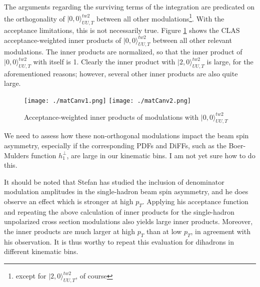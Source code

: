 \documentclass[12pt]{article}
\begin{document}
The arguments regarding the surviving terms of the integration are predicated on
the orthogonality of $|0,0\rangle_{UU,T}^{tw2}$ between all other
modulations\footnote{except for $|2,0\rangle_{UU,T}^{tw2}$, of course}. With the
acceptance limitations, this is not necessarily true. Figure \ref{innerproducts}
shows the CLAS acceptance-weighted inner products of $|0,0\rangle_{UU,T}^{tw2}$
between all other relevant modulations. The inner products are normalized, so
that the inner product of $|0,0\rangle_{UU,T}^{tw2}$ with itself is 1. Clearly
the inner product with $|2,0\rangle_{UU,T}^{tw2}$ is large, for the
aforementioned reasons; however, several other inner products are also quite
large.


\begin{figure}[h!]
\centering
\texttt{[image: ./matCanv1.png]}
\texttt{[image: ./matCanv2.png]}
\caption{Acceptance-weighted inner products of modulations with $|0,0\rangle_{UU,T}^{tw2}$}
\label{innerproducts}
\end{figure}

We need to assess how these non-orthogonal modulations impact the beam spin
asymmetry, especially if the corresponding PDFs and DiFFs, such as the
Boer-Mulders function $h_1^{\perp}$, are large in our kinematic bins. I am not
yet sure how to do this.

It should be noted that Stefan has studied the inclusion of denominator
modulation amplitudes in the single-hadron beam spin asymmetry, and he does
observe an effect which is stronger at high $p_T$. Applying his acceptance
function and repeating the above calculation of inner products for the
single-hadron unpolarized cross section modulations also yields large inner
products.  Moreover, the inner products are much larger at high $p_T$ than at
low $p_T$, in agreement with his observation. It is thus worthy to repeat this
evaluation for dihadrons in different kinematic bins. 
\end{document}
